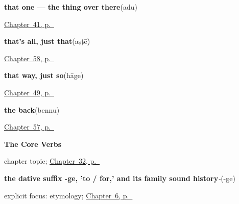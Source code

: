 \noindent\begin{minipage}[t]{\linewidth}
\raggedright
\textbf{that one — the thing over there}\enspace\emph{}\enspace(adu)\par
\footnotesize \hyperref[ch:kn-pointing-and-asking]{Chapter~41, p.~\pageref*{ch:kn-pointing-and-asking}}
\end{minipage}\par\smallskip

\noindent\begin{minipage}[t]{\linewidth}
\raggedright
\textbf{that's all, just that}\enspace\emph{}\enspace(aṣṭē)\par
\footnotesize \hyperref[ch:ka-more-replies]{Chapter~58, p.~\pageref*{ch:ka-more-replies}}
\end{minipage}\par\smallskip

\noindent\begin{minipage}[t]{\linewidth}
\raggedright
\textbf{that way, just so}\enspace\emph{}\enspace(hāge)\par
\footnotesize \hyperref[ch:ka-replies]{Chapter~49, p.~\pageref*{ch:ka-replies}}
\end{minipage}\par\smallskip

\noindent\begin{minipage}[t]{\linewidth}
\raggedright
\textbf{the back}\enspace\emph{}\enspace(bennu)\par
\footnotesize \hyperref[ch:ka-more-body]{Chapter~57, p.~\pageref*{ch:ka-more-body}}
\end{minipage}\par\smallskip

\noindent\begin{minipage}[t]{\linewidth}
\raggedright
\textbf{The Core Verbs}\par
\footnotesize chapter topic; \hyperref[ch:ka-core-verbs]{Chapter~32, p.~\pageref*{ch:ka-core-verbs}}
\end{minipage}\par\smallskip

\noindent\begin{minipage}[t]{\linewidth}
\raggedright
\textbf{the dative suffix -ge, 'to / for,' and its family sound history}\enspace\emph{-}\enspace(-ge)\par
\footnotesize explicit focus: etymology; \hyperref[ch:ka-dative-case]{Chapter~6, p.~\pageref*{ch:ka-dative-case}}
\end{minipage}\par\smallskip

